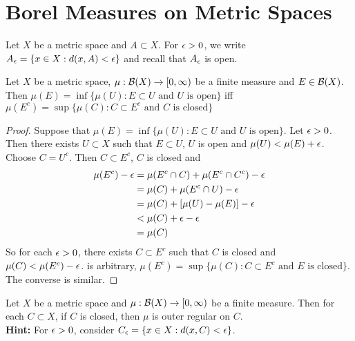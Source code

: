 \documentclass{book}
\begin{document}
	
	
	
	
	
	
	
	

	
	
	
	
	
	
	
	
	
	
	
	
	\newpage
	\section{Borel Measures on Metric Spaces}
	\begin{note}
		Let $X$ be a metric space and $A \subset X$. For $\epsilon >0$, we write $A_{\epsilon} = \{x \in X: d(x, A) < \epsilon\}$ and recall that $A_{\epsilon}$ is open.
	\end{note}

	\begin{ex}
		Let $X$ be a metric space, $\mu: \mathcal{B}(X) \rightarrow [0,\infty)$ be a finite measure and $E \in \mathcal{B}(X)$. Then 
		$\mu(E) = \inf  \{\mu(U): E \subset U \text{ and $U$ is open} \}$ iff $\mu(E^c) = \sup  \{\mu(C): C \subset E^c \text{ and $C$ is closed} \}$ \\
	\end{ex}

	\begin{proof}
		Suppose that $\mu(E) = \inf  \{\mu(U): E \subset U \text{ and $U$ is open} \}$. Let $\epsilon >0$. Then there exists $U \subset X$ such that $E \subset U$, $U$ is open and $\mu(U) < \mu(E) + \epsilon$. Choose $C = U^c$. Then $C \subset E^c$, $C$ is closed and 
		\begin{align*}
			\mu(E^c) - \epsilon 
			&= \mu(E^c \cap C) + \mu(E^c \cap C^c) - \epsilon \\
			&= \mu(C) + \mu(E^c \cap U) - \epsilon \\
			&= \mu(C) + [\mu(U) - \mu(E)] - \epsilon \\
			&< \mu(C) + \epsilon - \epsilon \\
			&= \mu(C)
		\end{align*}
		So for each $\epsilon > 0$, there exists $C \subset E^c$ such that $C$ is closed and $\mu(C) < \mu(E^c) - \epsilon$. is arbitrary, $\mu(E^c) = \sup\{\mu(C): C \subset E^c \text{ and $E$ is closed}\}$. \\
		The converse is similar. 
	\end{proof}

	\begin{ex}
		Let $X$ be a metric space and $\mu: \mathcal{B}(X) \rightarrow [0,\infty)$ be a finite measure. Then for each $C \subset X$, if $C$ is closed, then $\mu$ is outer regular on $C$. \\
		\textbf{Hint:} For $\epsilon >0$, consider $C_{\epsilon} = \{x \in X: d(x, C) < \epsilon\}$. 
	\end{ex}
\end{document}
